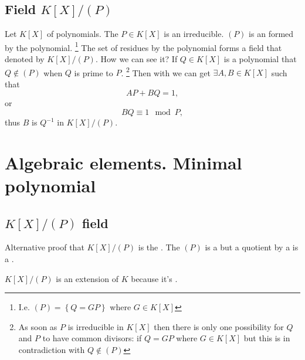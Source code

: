 \subsection{Field $K\left[X\right]/\left(P\right)$}
Let $K\left[X\right]$  of polynomials.
The $P \in K\left[X\right]$ is an irreducible. $\left(P\right)$ is an
 formed by the polynomial.
\footnote{
  I.e.
  \(
  \left(P\right) = \left\{ Q = G P \right\} 
  \)
  where $G \in K\left[X\right]$
}
The set of residues by
the polynomial forms a field that denoted by
$K\left[X\right]/\left(P\right)$. How we can see it?
If $Q \in K\left[X\right]$ is a polynomial that $Q \notin
\left(P\right)$ when $Q$ is prime to $P$.
\footnote{
  As soon as $P$ is irreducible in $K\left[X\right]$ then there is only
  one possibility for $Q$ and $P$ to have common divisors: if $Q = G P$
  where $G \in K\left[X\right]$ but this is in contradiction with
  $Q \notin \left(P\right)$
}
Then with
 we can get $\exists A, B \in K\left[X\right]$
such that
\[
A P + B Q = 1,
\]
or
\[
B Q \equiv 1 \mod P,
\]
thus $B$ is $Q^{-1}$ in $K\left[X\right]/\left(P\right)$.


\section{Algebraic elements. Minimal polynomial}

\subsection{$K\left[X\right]/\left(P\right)$ field}

Alternative proof that $K\left[X\right]/\left(P\right)$ is the
. The $\left(P\right)$ is a 
but a quotient by a   is a .

$K\left[X\right]/\left(P\right)$ is an extension of $K$ because it's
.

